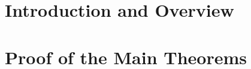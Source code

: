 \documentclass[11pt]{amsart}
\theoremstyle{plain}
\theoremstyle{definition}
\theoremstyle{remark}
\theoremstyle{plain}
\numberwithin{equation}{section}
\begin{document}
\part{Introduction and Overview}

\part{Proof of the Main Theorems}
\end{document}
